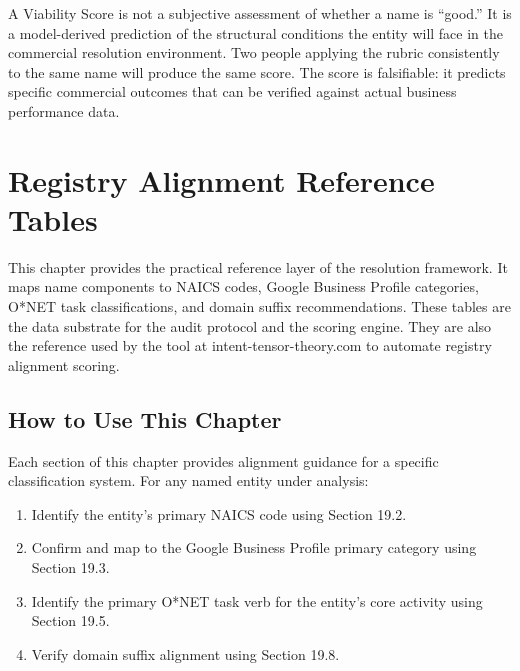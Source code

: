 \documentclass[12pt, openany]{book}
\theoremstyle{thmstyle}
\theoremstyle{defstyle}
\begin{document}
\begin{keybox}
A Viability Score is not a subjective assessment of whether a name is ``good.'' It is a model-derived prediction of the structural conditions the entity will face in the commercial resolution environment. Two people applying the rubric consistently to the same name will produce the same score. The score is falsifiable: it predicts specific commercial outcomes that can be verified against actual business performance data.
\end{keybox}

\chapter{Registry Alignment Reference Tables}

\begin{keybox}
This chapter provides the practical reference layer of the resolution framework. It maps name components to NAICS codes, Google Business Profile categories, O*NET task classifications, and domain suffix recommendations. These tables are the data substrate for the audit protocol and the scoring engine. They are also the reference used by the tool at intent-tensor-theory.com to automate registry alignment scoring.
\end{keybox}

\section{How to Use This Chapter}

Each section of this chapter provides alignment guidance for a specific classification system. For any named entity under analysis:

\begin{enumerate}[leftmargin=1.5em]
  \item Identify the entity's primary NAICS code using Section 19.2.
  \item Confirm and map to the Google Business Profile primary category using Section 19.3.
  \item Identify the primary O*NET task verb for the entity's core activity using Section 19.5.
  \item Verify domain suffix alignment using Section 19.8.
\end{enumerate}
\end{document}
